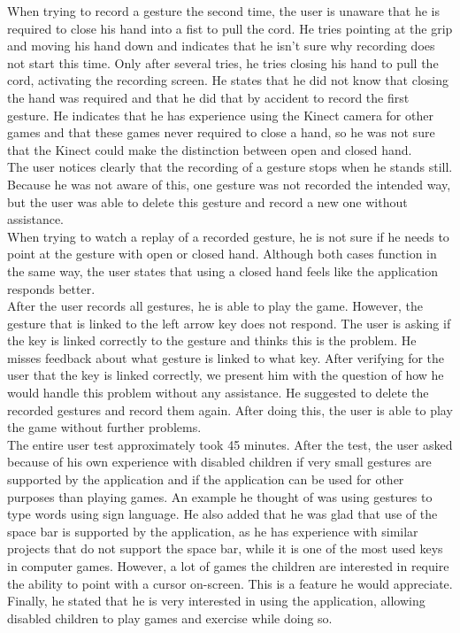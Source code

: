 When trying to record a gesture the second time, the user is unaware that he is required to close his hand into a fist to pull the cord. He tries pointing at the grip and moving his hand down and indicates that he isn't sure why recording does not start this time. Only after several tries, he tries closing his hand to pull the cord, activating the recording screen. He states that he did not know that closing the hand was required and that he did that by accident to record the first gesture. He indicates that he has experience using the Kinect camera for other games and that these games never required to close a hand, so he was not sure that the Kinect could make the distinction between open and closed hand.\\

The user notices clearly that the recording of a gesture stops when he stands still. Because he was not aware of this, one gesture was not recorded the intended way, but the user was able to delete this gesture and record a new one without assistance.\\

When trying to watch a replay of a recorded gesture, he is not sure if he needs to point at the gesture with open or closed hand. Although both cases function in the same way, the user states that using a closed hand feels like the application responds better.\\

After the user records all gestures, he is able to play the game. However, the gesture that is linked to the left arrow key does not respond. The user is asking if the key is linked correctly to the gesture and thinks this is the problem. He misses feedback about what gesture is linked to what key. After verifying for the user that the key is linked correctly, we present him with the question of how he would handle this problem without any assistance. He suggested to delete the recorded gestures and record them again. After doing this, the user is able to play the game without further problems.\\

The entire user test approximately took 45 minutes. After the test, the user asked because of his own experience with disabled children if very small gestures are supported by the application and if the application can be used for other purposes than playing games. An example he thought of was using gestures to type words using sign language. He also added that he was glad that use of the space bar is supported by the application, as he has experience with similar projects that do not support the space bar, while it is one of the most used keys in computer games. However, a lot of games the children are interested in require the ability to point with a cursor on-screen. This is a feature he would appreciate. Finally, he stated that he is very interested in using the application, allowing disabled children to play games and exercise while doing so.


